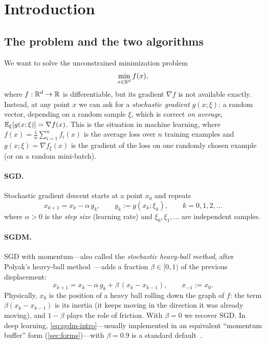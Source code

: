 \section{Introduction}\label{sec:intro}

\subsection{The problem and the two algorithms}

We want to solve the unconstrained minimization problem
\begin{equation}\label{eq:problem}
  \min_{x\in\mathbb{R}^d} f(x),
\end{equation}
where $f:\mathbb{R}^d\to\mathbb{R}$ is differentiable, but its gradient $\nabla f$ is not available
exactly. Instead, at any point $x$ we can ask for a \emph{stochastic gradient}
$g(x;\xi)$: a random vector, depending on a random sample $\xi$, which is correct
\emph{on average}, $\mathbb{E}_\xi[g(x;\xi)]=\nabla f(x)$. This is the situation in machine
learning, where $f(x)=\frac1n\sum_{i=1}^n f_i(x)$ is the average loss over $n$ training
examples and $g(x;\xi)=\nabla f_\xi(x)$ is the gradient of the loss on one randomly chosen
example (or on a random mini-batch).

\paragraph{SGD.} Stochastic gradient descent starts at a point $x_0$ and repeats
\begin{equation}\label{eq:sgd}
  x_{k+1}=x_k-\alpha\, g_k,\qquad g_k:=g(x_k;\xi_k),\qquad k=0,1,2,\dots
\end{equation}
where $\alpha>0$ is the \emph{step size} (learning rate) and $\xi_0,\xi_1,\dots$ are
independent samples.

\paragraph{SGDM.} SGD with momentum---also called the \emph{stochastic heavy-ball
method}, after Polyak's heavy-ball method~\cite{polyak1964}---adds a fraction
$\beta\in[0,1)$ of the previous displacement:
\begin{equation}\label{eq:sgdm-intro}
  x_{k+1}=x_k-\alpha\, g_k+\beta\,(x_k-x_{k-1}),\qquad x_{-1}:=x_0 .
\end{equation}
Physically, $x_k$ is the position of a heavy ball rolling down the graph of $f$: the term
$\beta(x_k-x_{k-1})$ is its inertia (it keeps moving in the direction it was already
moving), and $1-\beta$ plays the role of friction. With $\beta=0$ we recover SGD. In deep
learning, \eqref{eq:sgdm-intro}---usually implemented in an equivalent ``momentum buffer''
form (\cref{sec:forms})---with $\beta=0.9$ is a standard default~\cite{sutskever2013}.

